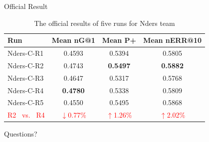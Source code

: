 \documentclass[aspectratio=169]{beamer}
\begin{document}
  \begin{frame}{Official Result}
    \begin{table}
\centering
\caption{The official results of five runs for Nders team}
\label{tab:commands}
\begin{minipage}{\columnwidth}
\begin{center}
\begin{tabular}{|l|c|c|c|}
\hline
 Run        &  Mean nG@1  &  Mean P+  &  Mean nERR@10  \\ \hline
 Nders-C-R1 & 0.4593 & 0.5394 & 0.5805 \\ \hline
 Nders-C-R2 & 0.4743 & \textbf{0.5497} & \textbf{0.5882} \\ \hline
 Nders-C-R3 & 0.4647 & 0.5317 & 0.5768 \\ \hline
 Nders-C-R4 & \textbf{0.4780} & 0.5338 & 0.5809 \\ \hline
 Nders-C-R5 & 0.4550 & 0.5495 & 0.5868 \\ \hline
 \textcolor{red}{R2 \ vs. \  R4}  & \textcolor{red}{$\downarrow$0.77\%} & \textcolor{red}{$\uparrow$1.26\%} & \textcolor{red}{$\uparrow$2.02\%} \\ \hline

\end{tabular}
\end{center}
\end{minipage}
\end{table}
  \end{frame}

  \begin{frame}[standout]
    Questions?
  \end{frame}
\end{document}
